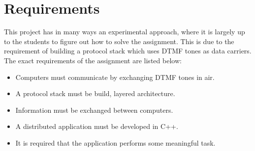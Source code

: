 \section{Requirements}
This project has in many ways an experimental approach, where it is largely up to the students to figure out how to solve the assignment. This is due to the requirement of building a protocol stack which uses DTMF tones as data carriers. The exact requirements of the assignment are listed below:

\begin{itemize}
\item Computers must communicate by exchanging DTMF tones in air.
\item A protocol stack must be build, layered architecture.
\item Information must be exchanged between computers.
\item A distributed application must be developed in C++.
\item It is required that the application performs some meaningful task.
\end{itemize}
